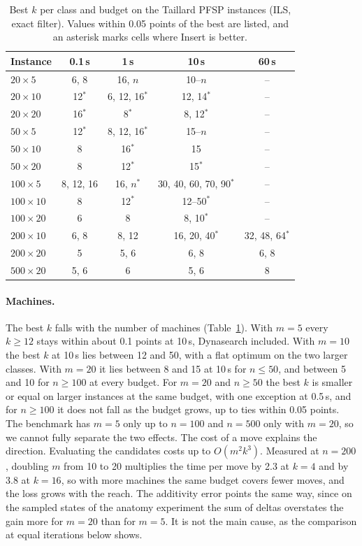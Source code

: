 \documentclass[letterpaper]{article} %
\theoremstyle{definition}
\begin{document}
\begin{table}[t]
\centering
\small
\setlength{\tabcolsep}{2.5pt}
\begin{tabular}{@{}lcccc@{}}
\toprule
Instance & 0.1\,s & 1\,s & 10\,s & 60\,s \\
\midrule
$20\times5$ & 6, 8 & 16, $n$ & 10--$n$ & -- \\
$20\times10$ & 12$^\ast$ & 6, 12, 16$^\ast$ & 12, 14$^\ast$ & -- \\
$20\times20$ & 16$^\ast$ & 8$^\ast$ & 8, 12$^\ast$ & -- \\
$50\times5$ & 12$^\ast$ & 8, 12, 16$^\ast$ & 15--$n$ & -- \\
$50\times10$ & 8 & 16$^\ast$ & 15 & -- \\
$50\times20$ & 8 & 12$^\ast$ & 15$^\ast$ & -- \\
$100\times5$ & 8, 12, 16 & 16, $n^\ast$ & 30, 40, 60, 70, 90$^\ast$ & -- \\
$100\times10$ & 8 & 12$^\ast$ & 12--50$^\ast$ & -- \\
$100\times20$ & 6 & 8 & 8, 10$^\ast$ & -- \\
$200\times10$ & 6, 8 & 8, 12 & 16, 20, 40$^\ast$ & 32, 48, 64$^\ast$ \\
$200\times20$ & 5 & 5, 6 & 6, 8 & 6, 8 \\
$500\times20$ & 5, 6 & 6 & 5, 6 & 8 \\
\bottomrule
\end{tabular}
\caption{Best $k$ per class and budget on the Taillard PFSP instances (ILS, exact filter). Values
within 0.05 points of the best are listed, and an asterisk marks cells
where Insert is better.}
\label{tab:bestk}
\end{table}

\paragraph{Machines.} The best $k$ falls with the number of machines
(Table~\ref{tab:bestk}). With $m=5$ every $k\geq 12$ stays within about
0.1 points at 10\,s, Dynasearch included. With $m=10$ the best $k$ at 10\,s
lies between 12 and 50, with a flat optimum on the two larger classes. With $m=20$ it lies between 8 and 15 at 10\,s for
$n\leq 50$, and between 5 and 10 for $n\geq 100$ at every budget. For $m=20$ and $n\geq 50$ the best $k$ is smaller or equal on larger instances at the same budget, with one exception at 0.5\,s, and for $n\geq 100$ it does not fall as the budget grows, up to ties within 0.05 points. The benchmark has
$m=5$ only up to $n=100$ and $n=500$ only with $m=20$, so we cannot fully
separate the two effects. The cost of a move explains the direction.
Evaluating the candidates costs up to $O(m^2k^3)$. Measured at $n=200$, doubling $m$ from 10 to 20 multiplies the time per move by 2.3 at $k=4$ and by 3.8 at $k=16$, so with more machines the same budget covers fewer moves, and the loss grows with the reach. The additivity error points the same way, since on the
sampled states of the anatomy experiment the sum of deltas overstates
the gain more for $m=20$ than for $m=5$. It is not the main cause, as the comparison at equal iterations below
shows.
\end{document}
